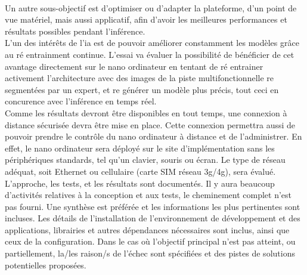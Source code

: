 \vspace{\baselineskip}
\\
\noindent Un autre sous-objectif est d'optimiser ou d'adapter la plateforme, d'un point de vue matériel, mais aussi applicatif, afin d'avoir les meilleures performances et résultats possibles pendant l'inférence.
\vspace{\baselineskip}
\\
\noindent L'un des intérêts de l'\acrshort{ia} est de pouvoir améliorer constamment les modèles grâce au ré entrainment continue. L'essai va évaluer la possibilité de bénéficier de cet avantage directement sur le nano ordinateur en tentant de ré entrainer activement l'architecture avec des images de la piste multifonctionnelle re segmentées par un expert, et re générer un modèle plus précis, tout ceci en concurence avec l'inférence en temps réel. 
\vspace{\baselineskip}
\\
\noindent Comme les résultats devront être disponibles en tout temps, une connexion à distance sécurisée devra être mise en place. Cette connexion permettra aussi de pouvoir prendre le contrôle du nano ordinateur à distance et de l'administrer. En effet, le nano ordinateur sera déployé sur le site d'implémentation sans les périphériques standards, tel qu'un clavier, souris ou écran. Le type de réseau adéquat, soit Ethernet ou cellulaire (carte SIM réseau 3g/4g), sera évalué.
\vspace{\baselineskip}
\\
\noindent L'approche, les tests, et les résultats sont documentés. Il y aura beaucoup d'activités relatives à la conception et aux tests, le cheminement complet n'est pas fourni. Une synthèse est préférée et les informations les plus pertinentes sont incluses. Les détails de l'installation de l'environnement de développement et des applications, librairies et autres dépendances nécessaires sont inclus, ainsi que ceux de la configuration. Dans le cas où l'objectif principal n'est pas atteint, ou partiellement, la/les raison/s de l'échec sont spécifiées et des pistes de solutions potentielles proposées.